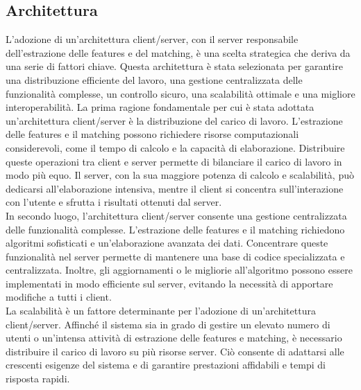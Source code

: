 \documentclass[a4paper,12pt]{report}
\begin{document}
    \subsection{Architettura}

    L'adozione di un'architettura client/server, con il server responsabile dell'estrazione delle features e del matching, è una scelta strategica che deriva da una serie di fattori chiave. Questa architettura è stata selezionata per garantire una distribuzione efficiente del lavoro, una gestione centralizzata delle funzionalità complesse, un controllo sicuro, una scalabilità ottimale e una migliore interoperabilità.
    La prima ragione fondamentale per cui è stata adottata un'architettura client/server è la distribuzione del carico di lavoro. L'estrazione delle features e il matching possono richiedere risorse computazionali considerevoli, come il tempo di calcolo e la capacità di elaborazione. Distribuire queste operazioni tra client e server permette di bilanciare il carico di lavoro in modo più equo. Il server, con la sua maggiore potenza di calcolo e scalabilità, può dedicarsi all'elaborazione intensiva, mentre il client si concentra sull'interazione con l'utente e sfrutta i risultati ottenuti dal server.
    \\
    In secondo luogo, l'architettura client/server consente una gestione centralizzata delle funzionalità complesse. L'estrazione delle features e il matching richiedono algoritmi sofisticati e un'elaborazione avanzata dei dati. Concentrare queste funzionalità nel server permette di mantenere una base di codice specializzata e centralizzata. Inoltre, gli aggiornamenti o le migliorie all'algoritmo possono essere implementati in modo efficiente sul server, evitando la necessità di apportare modifiche a tutti i client.
    \\
    La scalabilità è un fattore determinante per l'adozione di un'architettura client/server. Affinché il sistema sia in grado di gestire un elevato numero di utenti o un'intensa attività di estrazione delle features e matching, è necessario distribuire il carico di lavoro su più risorse server. Ciò consente di adattarsi alle crescenti esigenze del sistema e di garantire prestazioni affidabili e tempi di risposta rapidi.
\end{document}
